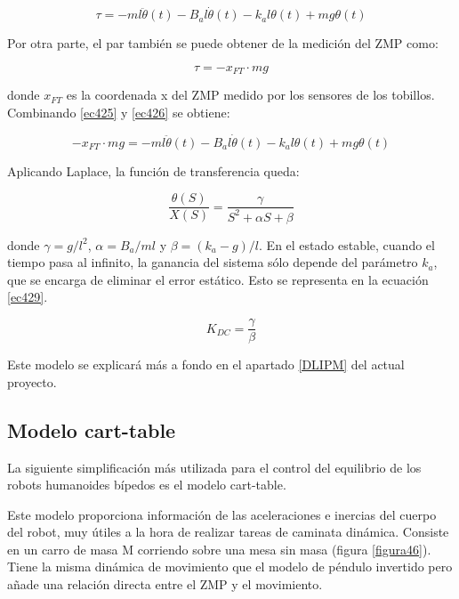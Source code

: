 \begin{equation}
\tau = -ml\ddot{\theta}(t) - B_a l\dot{\theta}(t) - k_a l\theta(t) + mg\theta(t)
\label{ec425}
\end{equation}

Por otra parte, el par también se puede obtener de la medición del ZMP como:

\begin{equation}
\tau = - x_{FT} \cdot mg
\label{ec426}
\end{equation}

donde $x_{FT}$ es la coordenada x del ZMP medido por los sensores de los tobillos. Combinando \ref{ec425} y \ref{ec426} se obtiene:

\begin{equation}
- x_{FT} \cdot mg = -ml\ddot{\theta}(t) - B_a l\dot{\theta}(t) - k_a l\theta(t) + mg\theta(t)
\label{ec427}
\end{equation}

Aplicando Laplace, la función de transferencia queda:

\begin{equation}
\frac{\theta(S)}{X(S)}=\frac{\gamma}{S^{2}+\alpha S+\beta }
\label{ec428}
\end{equation}

donde $\gamma=g/l^{2}$, $\alpha=B_{a}/ml$ y $\beta=(k_{a} - g)/l$. En el estado estable, cuando el tiempo pasa al infinito, la ganancia %
del sistema sólo depende del parámetro $k_a$, que se encarga de eliminar el error estático. Esto se representa en la ecuación \ref{ec429}.

\begin{equation}
K_{DC}=\frac{\gamma}{\beta}
\label{ec429}
\end{equation}

Este modelo se explicará más a fondo en el apartado \ref{DLIPM} del actual proyecto.

\newpage

\subsection{Modelo cart-table}

La siguiente simplificación más utilizada para el control del equilibrio de los robots humanoides bípedos es el modelo cart-table.

Este modelo proporciona información de las aceleraciones e inercias del cuerpo del robot, muy útiles a la hora de realizar tareas de caminata dinámica. Consiste en un carro de masa M corriendo sobre una mesa sin masa (figura \ref{figura46}). Tiene la misma dinámica de movimiento que el modelo de péndulo invertido pero añade una relación directa entre el ZMP y el movimiento.

